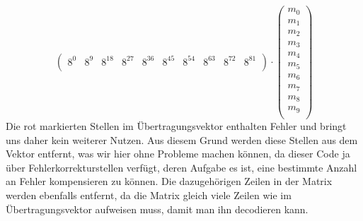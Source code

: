 \[\begin{pmatrix}
	8^0&	8^9& 8^{18}& 8^{27}& 8^{36}& 8^{45}& 8^{54}& 8^{63}& 8^{72}& 8^{81}\\
\end{pmatrix}
\cdot
\begin{pmatrix}
	m_0 \\ m_1 \\ m_2 \\ m_3 \\ m_4 \\ m_5 \\ m_6 \\ m_7 \\ m_8 \\ m_9 \\
\end{pmatrix}
\]
Die rot markierten Stellen im Übertragungsvektor enthalten Fehler und bringt uns daher kein weiterer Nutzen. 
Aus diesem Grund werden diese Stellen aus dem Vektor entfernt, was wir hier ohne Probleme machen können, da dieser Code ja über Fehlerkorrekturstellen verfügt, deren Aufgabe es ist, eine bestimmte Anzahl an Fehler kompensieren zu können.
Die dazugehörigen Zeilen in der Matrix werden ebenfalls entfernt, da die Matrix gleich viele Zeilen wie im Übertragungsvektor aufweisen muss, damit man ihn decodieren kann.

